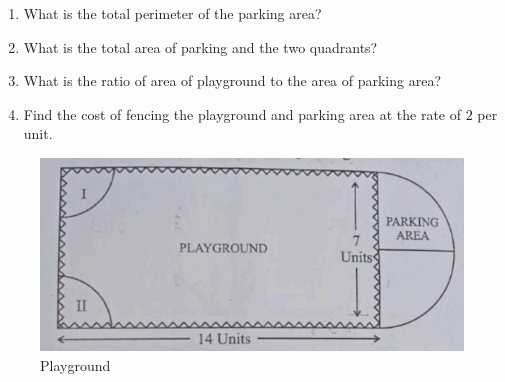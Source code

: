 \begin{enumerate}
            \begin{enumerate}
                \item What is the total perimeter of the parking area?
                \item What is the total area of parking and the two quadrants?
                \item What is the ratio of area of playground to the area of parking area?
                \item Find the cost of fencing the playground and parking area at the rate of \rupee $2$ per unit.
            \end{enumerate}
    \begin{figure}[!ht]
        \centering
        \includegraphics[width=\columnwidth]{figs/30-4-3-question36.png}
        \caption{Playground}
        \label{fig:enter-label}
    \end{figure}
\end{enumerate}
%
